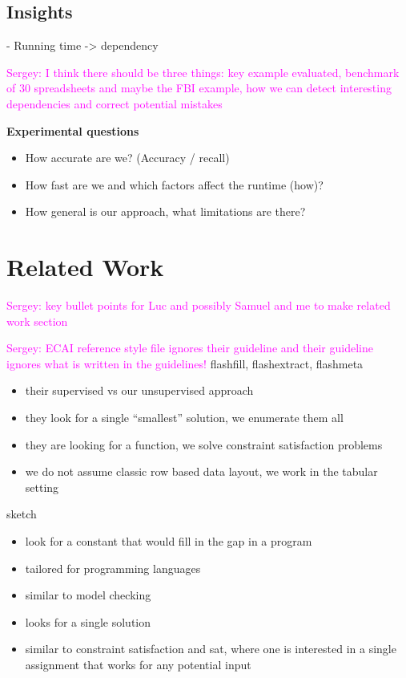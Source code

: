 \documentclass{ecai}
\newcommand{\sergey}[1]{\textcolor{magenta}{{\sc Sergey:} #1}\xspace}
\begin{document}
\subsection{Insights}
- Running time -> dependency


\sergey{I think there should be three things: key example evaluated, benchmark of 30 spreadsheets and maybe the FBI example, how we can detect interesting dependencies and correct potential mistakes}


{\bfseries 
  Experimental questions
}

\begin{itemize}
  \item  How accurate are we? (Accuracy / recall)
  \item  How fast are we and which factors affect the runtime (how)?
  \item  How general is our approach, what limitations are there?
\end{itemize}


\section{Related Work}
\sergey{key bullet points for Luc and possibly Samuel and me to make related work section}

\sergey{ECAI reference style file ignores their guideline and their guideline ignores what is written in the guidelines!}
flashfill, flashextract, flashmeta \cite{flashfill,flashextract,flashmeta}
\begin{itemize}
  \item their supervised vs our unsupervised approach
  \item they look for a single ``smallest'' solution, we enumerate them all
  \item they are looking for a function, we solve constraint satisfaction problems
  \item we do not assume classic row based data layout, we work in the tabular setting
\end{itemize}

sketch \cite{sketch}
\begin{itemize}
  \item look for a constant that would fill in the gap in a program
  \item tailored for programming languages
  \item similar to model checking
  \item looks for a single solution
  \item similar to constraint satisfaction and sat, where one is interested in a single assignment that works for any potential input
\end{itemize}
\end{document}
